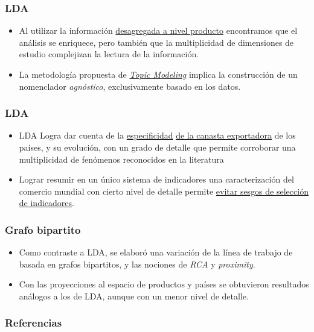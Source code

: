 \documentclass[compress]{beamer}
\begin{document}
\begin{frame}
\frametitle{LDA}
\begin{itemize}[label=\faRebel]
\item Al utilizar la información \underline{desagregada a nivel producto} encontramos que el análisis se enriquece, pero también que la multiplicidad de dimensiones de estudio complejizan la lectura de la información. 
\item La metodología propuesta de \underline{\textit{Topic Modeling}} implica la construcción de un nomenclador \textit{agnóstico}, exclusivamente basado en los datos.
\end{itemize}
\end{frame}

\begin{frame}
\frametitle{LDA}
\begin{itemize}[label=\faRebel]

\item LDA Logra dar cuenta de la \underline{especificidad} \underline{de la canasta exportadora} de los países, y su evolución, con un grado de detalle que permite corroborar una multiplicidad de fenómenos reconocidos en la literatura
\item Lograr resumir en un único sistema de indicadores una caracterización del comercio mundial con cierto nivel de detalle permite \underline{evitar sesgos de selección de indicadores}.
\end{itemize}
\end{frame}

\begin{frame}
\frametitle{Grafo bipartito}
\begin{itemize}[label=\faRebel]
\item Como contraste a LDA, se elaboró una variación de la línea de trabajo de \cite{Hidalgo2007} basada en grafos bipartitos, y las nociones de  \textit{RCA} y \textit{proximity}. 
\item Con las proyecciones al espacio de productos y países se obtuvieron resultados análogos a los de LDA, aunque con un menor nivel de detalle.
\end{itemize}
\end{frame}

\begin{frame}
\frametitle{Referencias}

\tiny


\end{frame}
\end{document}
